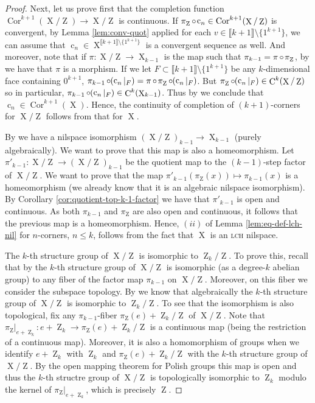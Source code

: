 \documentclass[a4paper,12pt,reqno]{amsart}
\theoremstyle{definition}
\def\to{\rightarrow}
\newcommand*{\db}[1]{\llbracket #1\rrbracket}
\DeclareMathOperator{\ab}{Z}
\DeclareMathOperator{\q}{c}
\DeclareMathOperator{\ns}{X}
\DeclareMathOperator{\co}{\circ\hspace{-0.02 cm}}
\DeclareMathOperator{\cu}{C}
\DeclareMathOperator{\cor}{Cor}
\begin{document}
\begin{proof}
Next, let us prove first that the completion function $\cor^{k+1}(\ns/\ab)\to \ns/\ab$ is continuous. If $\pi_{\ab}\co \q_n\in \cor^{k+1}(\ns/\ab)$ is convergent, by Lemma \ref{lem:conv-quot} applied for each $v\in \db{k+1}\setminus\{1^{k+1}\}$, we can assume that $\q_n\in \ns^{\db{k+1}\setminus\{1^{k+1}\}}$ is a convergent sequence as well. And moreover, note that if $\pi:\ns/\ab\to \ns_{k-1}$ is the map such that $\pi_{k-1}=\pi\co\pi_{\ab}$, by \cite[Proposition A.19 $(iii)$]{CGSS-p-hom} we have that $\pi$ is a morphism. If we let $F\subset \db{k+1}\setminus\{1^{k+1}\}$ be any $k$-dimensional face containing $0^{k+1}$, $\pi_{k-1}\co (\q_n|_F) = \pi\co \pi_{\ab}\co (\q_n|_F)$. But $\pi_{\ab}\co (\q_n|_F)\in \cu^k(\ns/\ab)$ so in particular, $\pi_{k-1}\co (\q_n|_F)\in \cu^k(\ns_{k-1})$. Thus by \cite[Remark 3.2.12]{Cand:Notes1} we conclude that $\q_n\in \cor^{k+1}(\ns)$. Hence, the continuity of completion of $(k+1)$-corners for $\ns/\ab$ follows from that for  $\ns$.

By \cite[Proposition A.19 $(iii)$]{CGSS-p-hom} we have a nilspace isomorphism $(\ns/\ab)_{k-1}\to \ns_{k-1}$ (purely algebraically). We want to prove that this map is also a homeomorphism. Let $\pi'_{k-1}:\ns/\ab\to (\ns/\ab)_{k-1}$ be the quotient map to the $(k-1)$-step factor of $\ns/\ab$. We want to prove that the map $\pi'_{k-1}(\pi_{\ab}(x)) \mapsto \pi_{k-1}(x)$ is a homeomorphism (we already know that it is an algebraic nilspace isomorphism). By Corollary \ref{cor:quotient-top-k-1-factor} we have that $\pi'_{k-1}$ is open and continuous. As both $\pi_{k-1}$ and $\pi_{\ab}$ are also open and continuous, it follows that the previous map is a homeomorphism. Hence, $(ii)$ of Lemma \ref{lem:eq-def-lch-nil} for $n$-corners, $n\le k$, follows from the fact that $\ns$ is an \textsc{lch} nilspace.

The $k$-th structure group of $\ns/\ab$ is isomorphic to $\ab_k/\ab$. To prove this, recall that by \cite[Corollary 3.2.16]{Cand:Notes1} the $k$-th structure group of $\ns/\ab$ is isomorphic (as a degree-$k$ abelian group) to any fiber of the factor map $\pi_{k-1}$ on $\ns/\ab$. Moreover, on this fiber we consider the subspace topology. By \cite[Proposition A.20]{CGSS-p-hom} we know that algebraically the $k$-th structure group of $\ns/\ab$ is isomorphic to $\ab_k/\ab$. To see that the isomorphism is also topological, fix any $\pi_{k-1}$-fiber $\pi_{\ab}(e)+\ab_k/\ab$ of $\ns/\ab$. Note that $\pi_{\ab}|_{e+\ab_k}: e+\ab_k\to \pi_{\ab}(e)+\ab_k/\ab$ is a continuous map (being the restriction of a continuous map). Moreover, it is also a homomorphism of groups when we identify $e+\ab_k$ with $\ab_k$ and $\pi_{\ab}(e)+\ab_k/\ab$ with the $k$-th structure group of $\ns/\ab$. By the open mapping theorem for Polish groups this map is open and thus the $k$-th structre group of $\ns/\ab$ is topologically isomorphic to $\ab_k$ modulo the kernel of $\pi_{\ab}|_{e+\ab_k}$, which is precisely $\ab$. \end{proof}
\end{document}
